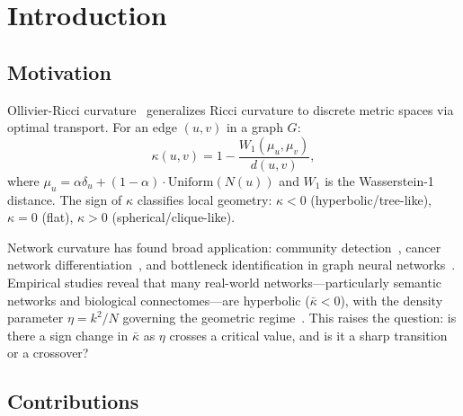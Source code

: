 \documentclass[12pt]{article}
\newcommand{\kbar}{\bar{\kappa}}
\newcommand{\Wone}{W_1}
\begin{document}
\newpage
\tableofcontents
\newpage

\section{Introduction}
\label{sec:intro}

\subsection{Motivation}

Ollivier-Ricci curvature~\cite{Ollivier2009} generalizes Ricci curvature to discrete metric
spaces via optimal transport. For an edge $(u,v)$ in a graph $G$:
\begin{equation}
  \kappa(u,v) = 1 - \frac{\Wone(\mu_u, \mu_v)}{d(u,v)},
  \label{eq:orc}
\end{equation}
where $\mu_u = \alpha \delta_u + (1-\alpha)\cdot\mathrm{Uniform}(N(u))$ and $\Wone$ is the
Wasserstein-1 distance. The sign of $\kappa$ classifies local geometry: $\kappa < 0$
(hyperbolic/tree-like), $\kappa = 0$ (flat), $\kappa > 0$ (spherical/clique-like).

Network curvature has found broad application: community detection~\cite{Sia2019},
cancer network differentiation~\cite{Sandhu2015}, and bottleneck identification in graph
neural networks~\cite{Topping2022}. Empirical studies reveal that many real-world
networks---particularly semantic networks and biological connectomes---are hyperbolic
($\kbar < 0$), with the density parameter $\eta = k^2/N$ governing the geometric
regime~\cite{Sia2019,Allard2020}. This raises the question: is there a sign change in $\kbar$ as $\eta$ crosses a critical value,
and is it a sharp transition or a crossover?

\subsection{Contributions}
\end{document}
